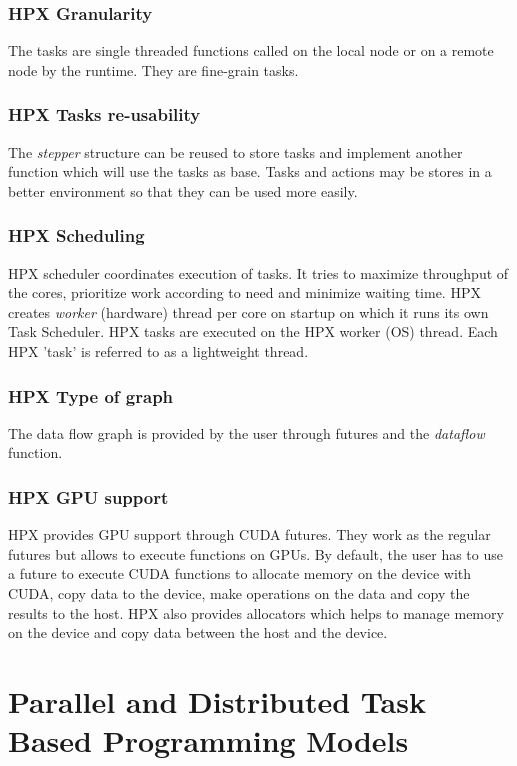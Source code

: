 \subsubsection{HPX Granularity}
The tasks are single threaded functions called on the local node or on a remote node by the runtime.
They are fine-grain tasks.

\subsubsection{HPX Tasks re-usability}
The \textit{stepper} structure can be reused to store tasks and implement another function which will use the tasks as base.
Tasks and actions may be stores in a better environment so that they can be used more easily.

\subsubsection{HPX Scheduling}
HPX scheduler coordinates execution of tasks.
It tries to maximize throughput of the cores, prioritize work according to need and minimize waiting time.
HPX creates \textit{worker} (hardware) thread per core on startup on which it runs its own Task Scheduler.
HPX tasks are executed on the HPX worker (OS) thread.
Each HPX 'task' is referred to as a lightweight thread.

\subsubsection{HPX Type of graph}
The data flow graph is provided by the user through futures and the \textit{dataflow} function.

\subsubsection{HPX GPU support}
HPX provides GPU support through CUDA futures.
They work as the regular futures but allows to execute functions on GPUs.
By default, the user has to use a future to execute CUDA functions to allocate memory on the device with CUDA, copy data to the device, make operations on the data and copy the results to the host.
HPX also provides allocators which helps to manage memory on the device and copy data between the host and the device.

\section{Parallel and Distributed Task Based Programming Models}
